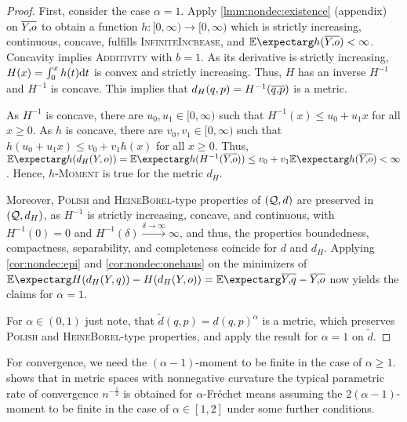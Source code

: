 \begin{proof}
First, consider the case $\alpha=1$.
Apply \autoref{lmm:nondec:existence} (appendix) on $\overline{Y,\!o}$ to obtain a function $h \colon [0,\infty) \to [0,\infty)$ which is strictly increasing, continuous, concave, fulfills \textsc{InfiniteIncrease}, and $\Ex{h(\ol Yo)} < \infty$. Concavity implies \textsc{Additivity} with $b=1$.
As its derivative is strictly increasing, $H(x) = \int_0^x h(t) \mathrm{d} t$ is convex and strictly increasing. Thus, $H$ has an inverse $H^{-1}$ and $H^{-1}$ is concave. 
This implies that $d_H(q,p) = H^{-1}(\overline{q,\!p})$ is a metric. 

As $H^{-1}$ is concave, there are $u_0, u_1 \in[0,\infty)$ such that $H^{-1}(x) \leq u_0 + u_1 x$ for all $x\geq0$.
As $h$ is concave, there are $v_0, v_1\in[0,\infty)$ such that $h(u_0 + u_1 x) \leq v_0 + v_1 h(x)$ for all $x\geq 0$.
Thus, $\Ex{h(d_H(Y, o))} = \Ex{h(H^{-1} (\ol Yo))} \leq v_0 + v_1 \Ex{h(\ol Yo)} < \infty$.
Hence, \textsc{$h$-Moment} is true for the metric $d_H$.

Moreover, \textsc{Polish} and \textsc{HeineBorel}-type properties of $(\mathcal{Q}, d)$ are preserved in $(\mathcal{Q}, d_H)$, as $H^{-1}$ is strictly increasing, concave, and continuous, with $H^{-1}(0) = 0$ and $H^{-1}(\delta)\xrightarrow{\delta\to\infty}\infty$, and thus, the properties boundedness, compactness, separability, and completeness coincide for $d$ and $d_H$.
Applying \autoref{cor:nondec:epi} and \autoref{cor:nondec:onehaus} on the minimizers of $\Ex{H(d_H(Y, q)) - H(d_H(Y, o))}  = \Ex{\ol  Yq - \ol Yo}$ now yields the claims for $\alpha=1$.

For $\alpha \in (0,1)$ just note, that $\tilde d(q,p) = d(q,p)^\alpha$ is a metric, which preserves \textsc{Polish} and \textsc{HeineBorel}-type properties, and apply the result for $\alpha = 1$ on $\tilde d$.
\end{proof}
%
\begin{remark}
	 For convergence, we need the $(\alpha-1)$-moment to be finite in the case of $\alpha \geq 1$. \cite[Corollary 5]{schoetz19} shows that in metric spaces with nonnegative curvature the typical parametric rate of convergence $n^{-\frac12}$ is obtained for $\alpha$-Fréchet means assuming the $2(\alpha-1)$-moment to be finite in the case of $\alpha\in[1,2]$ under some further conditions.
\end{remark}
%